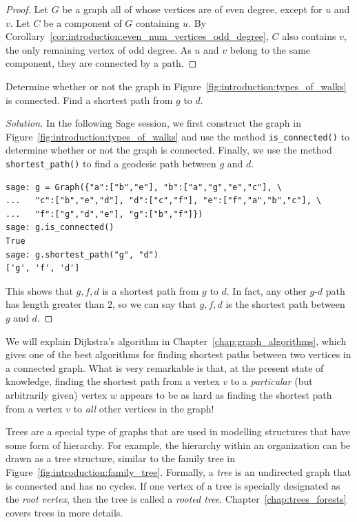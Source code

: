 \begin{proof}
Let $G$ be a graph all of whose vertices are of even degree, except
for $u$ and $v$. Let $C$ be a component of $G$ containing $u$. By
Corollary~\ref{cor:introduction:even_num_vertices_odd_degree}, $C$
also contains $v$, the only remaining vertex of odd degree. As $u$ and
$v$ belong to the same component, they are connected by a path.
\end{proof}

\begin{example}
Determine whether or not the graph in
Figure~\ref{fig:introduction:types_of_walks} is connected. Find a
shortest path from $g$ to $d$.
\end{example}

\begin{proof}[Solution]
In the following Sage session, we first construct the graph in
Figure~\ref{fig:introduction:types_of_walks} and use the method
\verb!is_connected()! to determine whether or not the graph is
connected. Finally, we use the method \verb!shortest_path()! to find
a geodesic path between $g$ and $d$.
%
\begin{lstlisting}
sage: g = Graph({"a":["b","e"], "b":["a","g","e","c"], \
...   "c":["b","e","d"], "d":["c","f"], "e":["f","a","b","c"], \
...   "f":["g","d","e"], "g":["b","f"]})
sage: g.is_connected()
True
sage: g.shortest_path("g", "d")
['g', 'f', 'd']
\end{lstlisting}
%
This shows that $g, f, d$ is a shortest path from $g$ to $d$. In fact,
any other $g$-$d$ path has length greater than $2$, so we can say that
$g, f, d$ is the shortest path between $g$ and $d$.
\end{proof}

\begin{remark}
\rm
We will explain Dijkstra's algorithm in
Chapter~\ref{chap:graph_algorithms}, which gives one of the best
algorithms for finding shortest paths between two vertices in a
connected graph. What is very remarkable is that, at the present state
of knowledge, finding the shortest path from a vertex $v$ to a
\emph{particular} (but arbitrarily given) vertex $w$ appears to be as
hard as finding the shortest path from a vertex $v$ to \emph{all}
other vertices in the graph!
\end{remark}

Trees are a special type of graphs that are used in modelling
structures that have some form of hierarchy. For example, the
hierarchy within an organization can be drawn as a tree
structure, similar to the family tree in
Figure~\ref{fig:introduction:family_tree}.
Formally, a \emph{tree}\index{tree} is an undirected graph that is
connected and has no cycles. If one vertex of a tree is specially
designated as the \emph{root vertex}\index{vertex!root}, then the tree
is called a  \emph{rooted tree}\index{tree!rooted}.
Chapter~\ref{chap:trees_forests} covers trees in more details.

